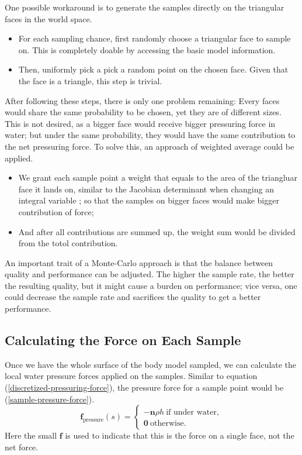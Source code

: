 One possible workaround is to generate the samples directly on the triangular faces in the world space.
\begin{itemize}
	\item For each sampling chance, first randomly choose a triangular face to sample on.
		This is completely doable by accessing the basic model information.
	\item Then, uniformly pick a pick a random point on the chosen face.
		Given that the face is a triangle, this step is trivial.
\end{itemize}

After following these steps, there is only one problem remaining:
Every faces would share the same probability to be chosen, yet they are of different sizes.
This is not desired, as a bigger face would receive bigger pressuring force in water;
but under the same probability, they would have the same contribution to the net pressuring force.
To solve this, an approach of weighted average could be applied.
\begin{itemize}
	\item We grant each sample point a weight that equals to the area of the triangluar face it lands on, similar to the Jacobian determinant when changing an integral variable \cite{waldron1985study};
	so that the samples on bigger faces would make bigger contribution of force;
	\item And after all contributions are summed up, the weight sum would be divided from the totol contribution.
\end{itemize}

An important trait of a Monte-Carlo approach is that the balance between quality and performance can be adjusted.
The higher the sample rate, the better the resulting quality, but it might cause a burden on performance;
vice versa, one could decrease the sample rate and sacrifices the quality to get a better performance.

\subsection{Calculating the Force on Each Sample}

Once we have the whole surface of the body model sampled, we can calculate the local water pressure forces applied on the samples.
Similar to equation (\ref{discretized-pressuring-force}), the pressure force for a sample point would be (\ref{sample-pressure-force}).
\begin{equation}
	\mathbf{f}_{\text{pressure}}(s)=
	\begin{cases}
		-\mathbf{n}\rho h \ \text{if under water}, \\
		\mathbf{0} \ \text{otherwise}.
	\end{cases}
	\label{sample-pressure-force}
\end{equation}
Here the small $\mathbf{f}$ is used to indicate that this is the force on a single face, not the net force.

